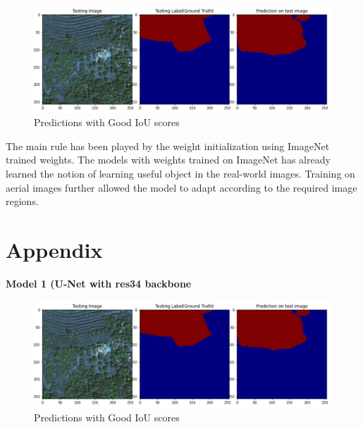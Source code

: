 \documentclass[rnd]{mas_proposal}
\begin{document}
\begin{figure}[htp] 
        \centering
        \includegraphics[width=1.2\textwidth]{images/fig13.png}
        \caption{ Predictions with Good  IoU scores}%
        \label{fig: Predictions with Good  IoU scores}%
\end{figure}



The main rule has been played by the weight initialization using ImageNet trained weights. The models with weights trained on ImageNet has already learned the 
notion of learning useful object in the real-world images. Training on aerial images further allowed the model to adapt according to the required image regions.  

\newpage
 

\newpage
\section{Appendix}


\textbf{Model 1 (U-Net with res34 backbone}
\vspace{10px}
\begin{figure}[htp] 
        \centering
        \includegraphics[width=1.2\textwidth]{images/fig13.png}
        \caption{ Predictions with Good  IoU scores}%
        \label{fig: Predictions with Good  IoU scoresS}%
\end{figure}
 
\end{document}
